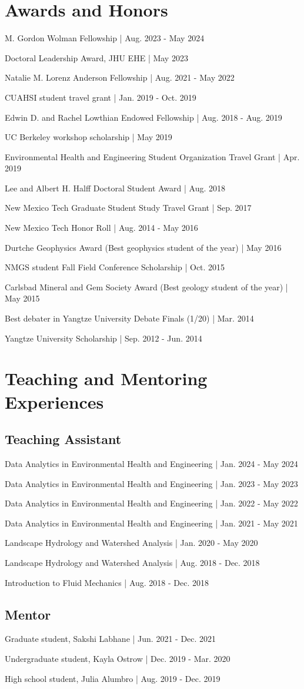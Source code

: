 \documentclass[12pt,letterpaper,sans]{moderncv}        %
\newcommand*{\award}[3][.25em]{

    { #2} {| #3}


    

  \par\addvspace{#1}}
\begin{document}
{\section{Awards and Honors}
\award{M. Gordon Wolman Fellowship}{Aug. 2023 - May 2024}
\award{Doctoral Leadership Award, JHU EHE}{May 2023}
\award{Natalie M. Lorenz Anderson Fellowship}{Aug. 2021 - May 2022}
\award{CUAHSI student travel grant}{Jan. 2019 - Oct. 2019}
\award{Edwin D. and Rachel Lowthian Endowed Fellowship}{Aug. 2018 - Aug. 2019}
\award{UC Berkeley workshop scholarship}{May 2019}
\award{Environmental Health and Engineering Student Organization Travel Grant}{Apr. 2019}
\award{Lee and Albert H. Halff Doctoral Student Award}{Aug. 2018}
\award{New Mexico Tech Graduate Student Study Travel Grant}{Sep. 2017}
\award{New Mexico Tech Honor Roll}{Aug. 2014 - May 2016}
\award{Durtche Geophysics Award (Best geophysics student of the year)}{May 2016}
\award{NMGS student Fall Field Conference Scholarship}{Oct. 2015}
\award{Carlsbad Mineral and Gem Society Award (Best geology student of the year)}{May 2015}
\award{Best debater in Yangtze University Debate Finals (1/20)}{Mar. 2014}
\award{Yangtze University Scholarship}{Sep. 2012 - Jun. 2014}


\nocite{*}
 

                              
\section{Teaching and Mentoring Experiences}
\subsection{Teaching Assistant}
\award{Data Analytics in Environmental Health and Engineering}{Jan. 2024 - May 2024}
\award{Data Analytics in Environmental Health and Engineering}{Jan. 2023 - May 2023}
\award{Data Analytics in Environmental Health and Engineering}{Jan. 2022 - May 2022}
\award{Data Analytics in Environmental Health and Engineering}{Jan. 2021 - May 2021}
\award{Landscape Hydrology and Watershed Analysis}{Jan. 2020 - May 2020}
\award{Landscape Hydrology and Watershed Analysis}{Aug. 2018 - Dec. 2018}
\award{Introduction to Fluid Mechanics}{Aug. 2018 - Dec. 2018}
\subsection{Mentor}
\award{Graduate student, Sakshi Labhane}{Jun. 2021 - Dec. 2021}
\award{Undergraduate student, Kayla Ostrow}{Dec. 2019 - Mar. 2020}
\award{High school student, Julia Alumbro}{Aug. 2019 -  Dec. 2019}

}
\end{document}
